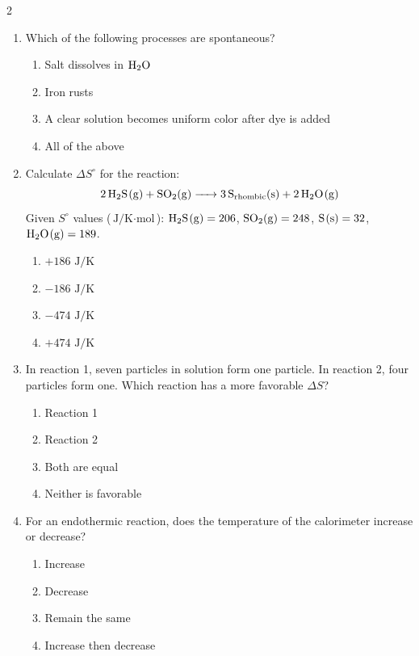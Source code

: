 \documentclass[12pt,letterpaper]{article}
\begin{document}
\begin{multicols*}{2}
\begin{enumerate}
        \item Which of the following processes are spontaneous? %
            \begin{enumerate}
                \item Salt dissolves in $\ce{H2O}$
                \item Iron rusts
                \item A clear solution becomes uniform color after dye is added
                \item All of the above
            \end{enumerate}
        \columnbreak
        \item Calculate $\Delta S^\circ$ for the reaction:
            \begin{equation*}
                \ce{2H2S(g) + SO2(g) -> 3S_{rhombic}(s) + 2H2O(g)}
            \end{equation*}
            Given $S^\circ$ values ($\text{J/K}\cdot\text{mol}$): $\ce{H2S(g)} = 206$, $\ce{SO2(g)} = 248$, $\ce{S(s)} = 32$, $\ce{H2O(g)} = 189$. %
            \begin{enumerate}
                \item $+186\text{ J/K}$
                \item $-186\text{ J/K}$
                \item $-474\text{ J/K}$
                \item $+474\text{ J/K}$
            \end{enumerate}

        \item In reaction 1, seven particles in solution form one particle. In reaction 2, four particles form one. Which reaction has a more favorable $\Delta S$? %
            \begin{enumerate}
                \item Reaction 1
                \item Reaction 2
                \item Both are equal
                \item Neither is favorable
            \end{enumerate}

        \item For an endothermic reaction, does the temperature of the calorimeter increase or decrease? %
            \begin{enumerate}
                \item Increase
                \item Decrease
                \item Remain the same
                \item Increase then decrease
            \end{enumerate}


\end{enumerate}
\end{multicols*}
\end{document}
